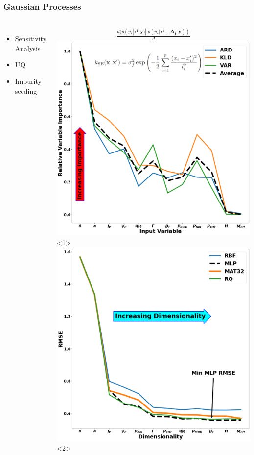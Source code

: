 \documentclass{beamer}
\begin{document}
\begin{frame}
\frametitle{Gaussian Processes}
\begin{columns}
\begin{itemize}
	\item<1-> Sensitivity Analysis
	\item<3-> UQ 
	\item<4-> Impurity seeding 
\end{itemize}
{%
\begin{align*}
	\frac{d(p(y_* | \mathbf{x^{i}, y}) || p(y_* | \mathbf{x^{i} + \Delta_j, y}))}{\Delta}
\end{align*}
}%
\hfill
{}
\includegraphics[scale=0.2]{../src/GP_sensitivity_analysis_final_V1_weq}<1>
\includegraphics[scale=0.2]{../src/final_GP_dim_v2}<2>

\end{columns}
\end{frame}
\end{document}
